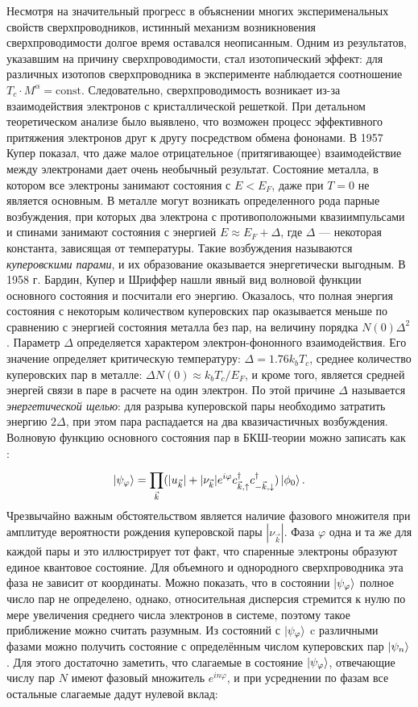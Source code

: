 Несмотря на значительный прогресс в объяснении многих эксперименальных свойств сверхпроводников, истинный механизм возникновения сверхпроводимости долгое время оставался неописанным. Одним из результатов, указавшим на причину сверхпроводимости, стал изотопический эффект: для различных изотопов сверхпроводника в эксперименте наблюдается соотношение $T_c \cdot M^{\alpha}=\text{const}$. Следовательно, сверхпроводимость возникает из-за взаимодействия электронов с кристаллической решеткой. При детальном теоретическом анализе было выявлено, что возможен процесс эффективного притяжения электронов друг к другу посредством обмена фононами. В 1957 Купер \cite{CooperPairs} показал, что даже малое отрицательное (притягивающее) взаимодействие между электронами дает очень необычный результат. Состояние металла, в котором все электроны занимают состояния с $E<E_F$, даже при $T=0$ не является основным. В металле могут возникать определенного рода парные возбуждения, при которых два электрона с противоположными квазиимпульсами и спинами занимают состояния с энергией $E\approx E_F\! +\! \Delta$, где $\Delta$ --- некоторая константа, зависящая от температуры. Такие возбуждения называются \textit{куперовскими парами}, и их образование оказывается энергетически выгодным.  В 1958 г. Бардин, Купер и Шриффер \cite{Bardeen} нашли явный вид волновой функции основного состояния  и посчитали его энергию. Оказалось, что полная энергия состояния с некоторым количеством куперовских пар оказывается меньше по сравнению с энергией состояния металла без пар, на величину порядка $N(0)\Delta^2$. Параметр $\Delta$ определяется характером электрон-фононного взаимодействия. Его значение определяет критическую температуру: $\Delta = 1.76 k_b T_c$, среднее количество куперовских пар в металле: $\Delta N(0) \approx k_b T_c/E_F$, и кроме того, является средней энергей связи в паре в расчете на один электрон. По этой причине $\Delta$ называется \textit{энергетической щелью}: для разрыва куперовской пары необходимо затратить энергию $2\Delta$, при этом пара распадается на два квазичастичных возбуждения. Волновую функцию основного состояния пар в БКШ-теории можно записать как \cite{Tinkham}:
\begin{equation}
\ket{\psi_\varphi} = \prod_{\vec{k}}^{}(|u_{\vec{k}}|+|\nu_{\vec{k}}|e^{i\varphi}c^\dag_{\vec{k},\uparrow}c^\dagger_{-\vec{k}, \downarrow})\ket{\phi_0}.
\end{equation}  
Чрезвычайно важным обстоятельством является наличие фазового множителя при амплитуде вероятности рождения куперовской пары $|\nu_{\vec{k}}|$. Фаза $\varphi$ одна и та же для каждой пары и это иллюстрирует тот факт, что спаренные электроны образуют единое квантовое состояние. Для объемного и однородного сверхпроводника эта фаза не зависит от координаты. Можно показать, что в состоянии $\ket{\psi_\varphi}$ полное число пар не определено, однако, относительная дисперсия стремится к нулю по мере увеличения среднего числа электронов в системе, поэтому такое приближение можно считать разумным. Из состояний с $\ket{\psi_\varphi}$ c различными фазами можно получить состояние с определённым числом куперовских пар $\ket{\psi_n}$. Для этого достаточно заметить, что слагаемые в состояние $\ket{\psi_\varphi}$, отвечающие числу пар $N$ имеют фазовый множитель $e^{in{\varphi}}$, и при усреднении по фазам все остальные слагаемые дадут нулевой вклад:
